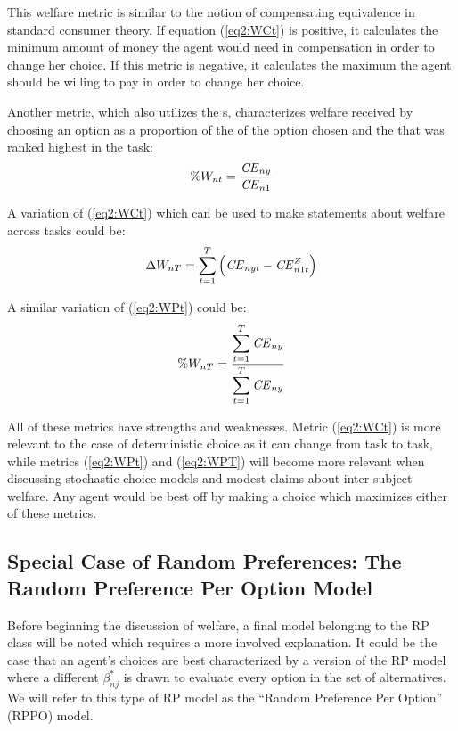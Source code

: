 \documentclass[../main.tex]{subfiles}
\begin{document}
This welfare metric is similar to the notion of compensating equivalence in standard consumer theory.
If equation (\ref{eq2:WCt}) is positive, it calculates the minimum amount of money the agent would need in compensation in order to change her choice.
If this metric is negative, it calculates the maximum the agent should be willing to pay in order to change her choice.

Another metric, which also utilizes the {\CE}s, characterizes welfare received by choosing an option as a proportion of the {\CE} of the option chosen and the {\CE} that was ranked highest in the task:
\begin{equation}
	\label{eq2:WPt}
	\%W_{nt} = \frac{ {\mathit{CE}}_{ny} }{ {\mathit{CE}}_{n1} }
\end{equation}

\noindent A variation of (\ref{eq2:WCt}) which can be used to make statements about welfare across tasks could be:
\begin{equation}
	\label{eq2:WCT}
	\Delta W_{nT} = \sum_{t=1}^T \left( {\mathit{CE}}_{nyt} - {\mathit{CE}}_{n1t}^Z \right)
\end{equation}

\noindent A similar variation of (\ref{eq2:WPt}) could be:
\begin{equation}
	\label{eq2:WPT}
	\%W_{nT} = \frac{\displaystyle\sum_{t=1}^{T} {\mathit{CE}}_{ny} }{\displaystyle\sum_{t=1}^{T} {\mathit{CE}}_{ny}}
\end{equation}

All of these metrics have strengths and weaknesses.
Metric (\ref{eq2:WCt}) is more relevant to the case of deterministic choice as it can change from task to task, while metrics (\ref{eq2:WPt}) and (\ref{eq2:WPT}) will become more relevant when discussing stochastic choice models and modest claims about inter-subject welfare.
Any agent would be best off by making a choice which maximizes either of these metrics.

\subsection{Special Case of Random Preferences: The Random Preference Per Option Model}

Before beginning the discussion of welfare, a final model belonging to the RP class will be noted which requires a more involved explanation.
It could be the case that an agent's choices are best characterized by a version of the RP model where a different $\beta^*_{nj}$ is drawn to evaluate every option in the set of alternatives.
We will refer to this type of RP model as the \enquote{Random Preference Per Option} (RPPO) model.
\end{document}
